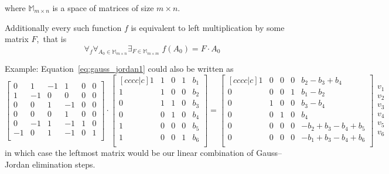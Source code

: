 \begin{description}
\begin{description}
            where $\mathbb{M}_{m \times n}$ is a space of matrices of size $m \times n$.

            Additionally every such function $f$ is equivalent to left multiplication by some matrix $F$,~that is
            {\large 
            \begin{equation}
                \forall_{f} \forall_{A_0 \in \mathbb{M}_{m \times n}} \exists_{F \in \mathbb{M}_{m \times m}} \; f(A_0) = F \cdot A_0
            \end{equation}
            }

            Example: Equation~\ref{eq:gauss_jordan1} could also be written as
            \begin{equation}
            \begin{bmatrix}
                0 & 1 & -1 & 1 & 0 & 0 \\
                1 & -1 & 0 & 0 & 0 & 0 \\
                0 & 0 & 1 & -1 & 0 & 0 \\ 
                0 & 0 & 0 & 1 & 0 & 0 \\ 
                0 & -1 & 1 & -1 & 1 & 0 \\ 
                -1 & 0 & 1 & -1 & 0 & 1 \\ 
            \end{bmatrix} \cdot
            \begin{bmatrix}[cccc|c]
                1 & 1 & 0 & 1 & b_1 \\
                1 & 1 & 0 & 0 & b_2 \\
                0 & 1 & 1 & 0 & b_3 \\ 
                0 & 0 & 1 & 0 & b_4 \\ 
                1 & 0 & 0 & 0 & b_5 \\ 
                1 & 0 & 0 & 1 & b_6 \\ 
            \end{bmatrix} =
            \begin{bmatrix}[cccc|c]
                1 & 0 & 0 & 0 & b_2 - b_3 + b_4 \\
                0 & 0 & 0 & 1 & b_1 - b_2 \\
                0 & 1 & 0 & 0 & b_3 - b_4 \\ 
                0 & 0 & 1 & 0 & b_4 \\ 
                0 & 0 & 0 & 0 & -b_2 + b_3 - b_4 + b_5 \\ 
                0 & 0 & 0 & 0 & -b_1 + b_3 - b_4 + b_6 \\ 
            \end{bmatrix}
            \begin{matrix}
            v_1 \\ v_2 \\ v_3 \\ v_4 \\ v_5 \\ v_6
            \end{matrix}
            \label{eq:gauss_jordan2}
            \end{equation}
            in which case the leftmost matrix would be our linear combination of Gauss--Jordan elimination steps.


\end{description}
\end{description}
